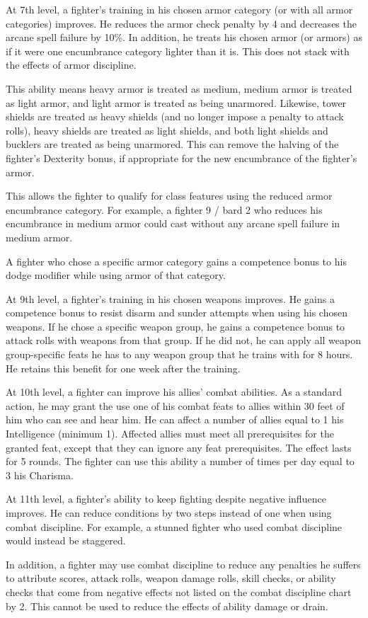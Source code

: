  At 7th level, a fighter's training in his chosen armor category (or with all armor categories) improves. He reduces the armor check penalty by 4 and decreases the arcane spell failure by 10\%. In addition, he treats his chosen armor (or armors) as if it were one encumbrance category lighter than it is. This does not stack with the effects of armor discipline.
\par This ability means heavy armor is treated as medium, medium armor is treated as light armor, and light armor is treated as being unarmored. Likewise, tower shields are treated as heavy shields (and no longer impose a  penalty to attack rolls), heavy shields are treated as light shields, and both light shields and bucklers are treated as being unarmored. This can remove the halving of the fighter's Dexterity bonus, if appropriate for the new encumbrance of the fighter's armor.
\par This allows the fighter to qualify for class features using the reduced armor encumbrance category. For example, a fighter 9 / bard 2 who reduces his encumbrance in medium armor could cast without any arcane spell failure in medium armor.
\par A fighter who chose a specific armor category gains a  competence bonus to his dodge modifier while using armor of that category.

 At 9th level, a fighter's training in his chosen weapons improves. He gains a  competence bonus to resist disarm and sunder attempts when using his chosen weapons. If he chose a specific weapon group, he gains a  competence bonus to attack rolls with weapons from that group. If he did not, he can apply all weapon group-specific feats he has to any weapon group that he trains with for 8 hours. He retains this benefit for one week after the training.

 At 10th level, a fighter can improve his allies' combat abilities. As a standard action, he may grant the use one of his combat feats to allies within 30 feet of him who can see and hear him. He can affect a number of allies equal to 1 \add his Intelligence (minimum 1). Affected allies must meet all prerequisites for the granted feat, except that they can ignore any feat prerequisites. The effect lasts for 5 rounds. The fighter can use this ability a number of times per day equal to 3 \add his Charisma.

 At 11th level, a fighter's ability to keep fighting despite negative influence improves. He can reduce conditions by two steps instead of one when using combat discipline. For example, a stunned fighter who used combat discipline would instead be staggered.
\par In addition, a fighter may use combat discipline to reduce any penalties he suffers to attribute scores, attack rolls, weapon damage rolls, skill checks, or ability checks that come from negative effects not listed on the combat discipline chart by 2. This cannot be used to reduce the effects of ability damage or drain.

